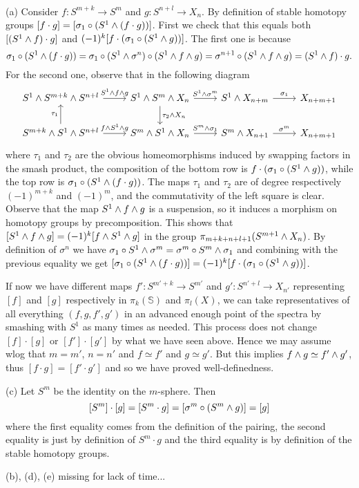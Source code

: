 \begin{exercise}[3]\

(a) Consider $f:S^{m+k}\to S^m$ and $g:S^{n+l}\to X_n$. By definition of stable homotopy groups $[f\cdot g]=[\sigma_1\circ(S^1\wedge(f\cdot g))]$. First we check that this equals both $[(S^1\wedge f)\cdot g]$ and $(-1)^k[f\cdot(\sigma_1\circ(S^1\wedge g))]$. The first one is because
\[\sigma_1\circ(S^1\wedge(f\cdot g))=\sigma_1\circ(S^1\wedge\sigma^n)\circ(S^1\wedge f\wedge g)=\sigma^{n+1}\circ(S^1\wedge f\wedge g)=(S^1\wedge f)\cdot g.\]
For the second one, observe that in the following diagram
\[
\begin{tikzcd}
S^1\smsh S^{m+k}\smsh S^{n+l} \ar[r,"S^1\smsh f\smsh g"] & S^1\smsh S^m\smsh X_n \ar[d,"\tau_2\smsh X_n"] \ar[r,"S^1\smsh\sigma^m"] & S^1\smsh X_{n+m} \ar[r,"\sigma_1"] & X_{n+m+1}\\
S^{m+k}\smsh S^1\smsh S^{n+l} \ar[u,"\tau_1"] \ar[r,"f\smsh S^1\smsh g"] & S^m\smsh S^1\smsh X_n \ar[r,"S^m\smsh\sigma_1"] & S^m\smsh X_{n+1} \ar[r,"\sigma^m"] & X_{n+m+1}
\end{tikzcd}
\]
where $\tau_1$ and $\tau_2$ are the obvious homeomorphisms induced by swapping factors in the smash product, the composition of the bottom row is $f\cdot(\sigma_1\circ(S^1\wedge g))$, while the top row is $\sigma_1\circ(S^1\wedge(f\cdot g))$. The maps $\tau_1$ and $\tau_2$ are of degree respectively $(-1)^{m+k}$ and $(-1)^m$, and the commutativity of the left square is clear. Observe that the map $S^1\wedge f\wedge g$ is a suspension, so it induces a morphism on homotopy groups by precomposition. This shows that $[S^1\wedge f\wedge g]=(-1)^k[f\wedge S^1\wedge g]$ in the group $\pi_{m+k+n+l+1}(S^{m+1}\wedge X_n)$. By definition of $\sigma^n$ we have $\sigma_1\circ S^1\wedge\sigma^m=\sigma^m\circ S^m\wedge\sigma_1$ and combining with the previous equality we get $[\sigma_1\circ(S^1\wedge(f\cdot g))]=(-1)^k[f\cdot(\sigma_1\circ(S^1\wedge g))]$.

If now we have different maps $f':S^{m'+k}\to S^{m'}$ and $g':S^{n'+l}\to X_{n'}$ representing $[f]$ and $[g]$ respectively in $\pi_k(\mathbb S)$ and $\pi_l(X)$, we can take representatives of all everything $(f,g,f',g')$ in an advanced enough point of the spectra by smashing with $S^1$ as many times as needed. This process does not change $[f]\cdot[g]$ or $[f']\cdot[g']$ by what we have seen above. Hence we may assume wlog that $m=m'$, $n=n'$ and $f\simeq f'$ and $g\simeq g'$. But this implies $f\wedge g\simeq f'\wedge g'$, thus $[f\cdot g]=[f'\cdot g']$ and so we have proved well-definedness.

(c) Let $S^m$ be the identity on the $m$-sphere. Then
\[[S^m]\cdot[g]=[S^m\cdot g]=[\sigma^m\circ(S^m\wedge g)]=[g]\]
where the first equality comes from the definition of the pairing, the second equality is just by definition of $S^m\cdot g$ and the third equality is by definition of the stable homotopy groups.

(b), (d), (e) missing for lack of time...

\end{exercise}


